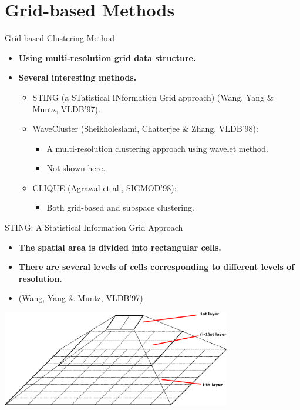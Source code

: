 \section{Grid-based Methods}

\begin{frame}{Grid-based Clustering Method}
	\begin{itemize}
		\item \textbf{Using multi-resolution grid data structure.}
		\item \textbf{Several interesting methods.}
		\begin{itemize}
			\item STING (a STatistical INformation Grid approach) (Wang, Yang 
			\& Muntz, VLDB'97).
			\item WaveCluster (Sheikholeslami, Chatterjee \& Zhang, VLDB'98):
			\begin{itemize}
				\item A multi-resolution clustering approach using wavelet 
				method.
				\item Not shown here.
			\end{itemize}
			\item CLIQUE (Agrawal et al., SIGMOD'98):
			\begin{itemize}
				\item Both grid-based and subspace clustering.
			\end{itemize}
		\end{itemize}
	\end{itemize}
\end{frame}

\begin{frame}{STING: A Statistical Information Grid Approach}
	\begin{itemize}
		\item \textbf{The spatial area is divided into rectangular cells.}
		\item \textbf{There are several levels of cells corresponding to 
		different levels of resolution.}
		\item (Wang, Yang \& Muntz, VLDB'97)
	\end{itemize}
	\vspace{0.5cm}
	\centering
	\includegraphics[width=10cm]{img/layers.pdf}
\end{frame}

